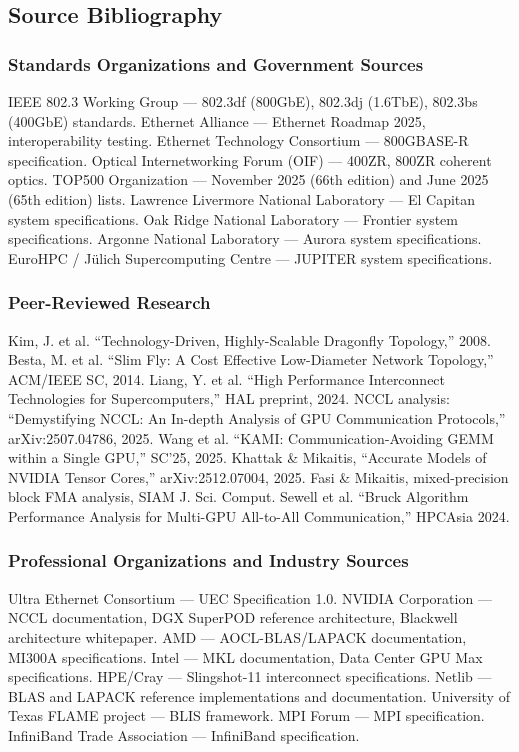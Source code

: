 \documentclass[11pt,letterpaper]{article}
\begin{document}
\subsection{Source Bibliography}

\subsubsection{Standards Organizations and Government Sources}
IEEE 802.3 Working Group --- 802.3df (800GbE), 802.3dj (1.6TbE), 802.3bs (400GbE) standards. Ethernet Alliance --- Ethernet Roadmap 2025, interoperability testing. Ethernet Technology Consortium --- 800GBASE-R specification. Optical Internetworking Forum (OIF) --- 400ZR, 800ZR coherent optics. TOP500 Organization --- November 2025 (66th edition) and June 2025 (65th edition) lists. Lawrence Livermore National Laboratory --- El Capitan system specifications. Oak Ridge National Laboratory --- Frontier system specifications. Argonne National Laboratory --- Aurora system specifications. EuroHPC / J\"{u}lich Supercomputing Centre --- JUPITER system specifications.

\subsubsection{Peer-Reviewed Research}
Kim, J. et al. ``Technology-Driven, Highly-Scalable Dragonfly Topology,'' 2008. Besta, M. et al. ``Slim Fly: A Cost Effective Low-Diameter Network Topology,'' ACM/IEEE SC, 2014. Liang, Y. et al. ``High Performance Interconnect Technologies for Supercomputers,'' HAL preprint, 2024. NCCL analysis: ``Demystifying NCCL: An In-depth Analysis of GPU Communication Protocols,'' arXiv:2507.04786, 2025. Wang et al. ``KAMI: Communication-Avoiding GEMM within a Single GPU,'' SC'25, 2025. Khattak \& Mikaitis, ``Accurate Models of NVIDIA Tensor Cores,'' arXiv:2512.07004, 2025. Fasi \& Mikaitis, mixed-precision block FMA analysis, SIAM J. Sci. Comput. Sewell et al. ``Bruck Algorithm Performance Analysis for Multi-GPU All-to-All Communication,'' HPCAsia 2024.

\subsubsection{Professional Organizations and Industry Sources}
Ultra Ethernet Consortium --- UEC Specification 1.0. NVIDIA Corporation --- NCCL documentation, DGX SuperPOD reference architecture, Blackwell architecture whitepaper. AMD --- AOCL-BLAS/LAPACK documentation, MI300A specifications. Intel --- MKL documentation, Data Center GPU Max specifications. HPE/Cray --- Slingshot-11 interconnect specifications. Netlib --- BLAS and LAPACK reference implementations and documentation. University of Texas FLAME project --- BLIS framework. MPI Forum --- MPI specification. InfiniBand Trade Association --- InfiniBand specification.
\end{document}
